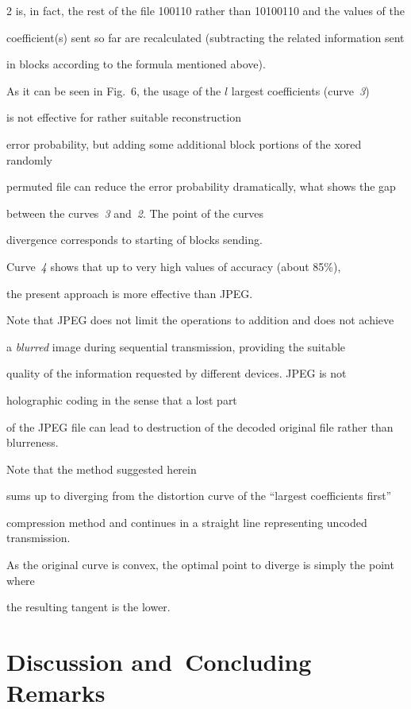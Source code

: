 \begin{multicols}{2}
is, in fact, the rest of the file 100110 rather than 10100110  and the values of the 

coefficient(s) sent so far are  recalculated (subtracting the related information sent 

in blocks according to the formula mentioned above).



As it can be seen in Fig.~6, the usage of the $l$ largest coefficients (curve~\textit{3}) 

is not effective for rather suitable reconstruction 

error probability, but adding some additional block portions of the xored randomly 

permuted file can reduce the error probability dramatically, what shows  the gap 

between the curves~\textit{3} and~\textit{2}. The point of the curves

divergence corresponds to starting of blocks sending.

Curve~\textit{4} shows that up to very high values of accuracy (about 85\%), 

the present approach is more effective than JPEG.

Note that  JPEG does not limit the operations to addition and does not achieve 

a {\it blurred} image during sequential transmission, providing the suitable

quality of the information requested by different devices. JPEG  is not 

holographic coding in the sense that a lost part

of the JPEG file can lead to destruction of the decoded original file rather than blurreness.

Note that the method suggested herein

sums up to diverging from the distortion curve of the ``largest coefficients first'' 

compression method and continues  in a straight line representing uncoded transmission. 

As the original curve is convex, the optimal point to diverge is simply the point where 

the resulting  tangent is the lower.





\section{Discussion and~Concluding Remarks}




\end{multicols}
